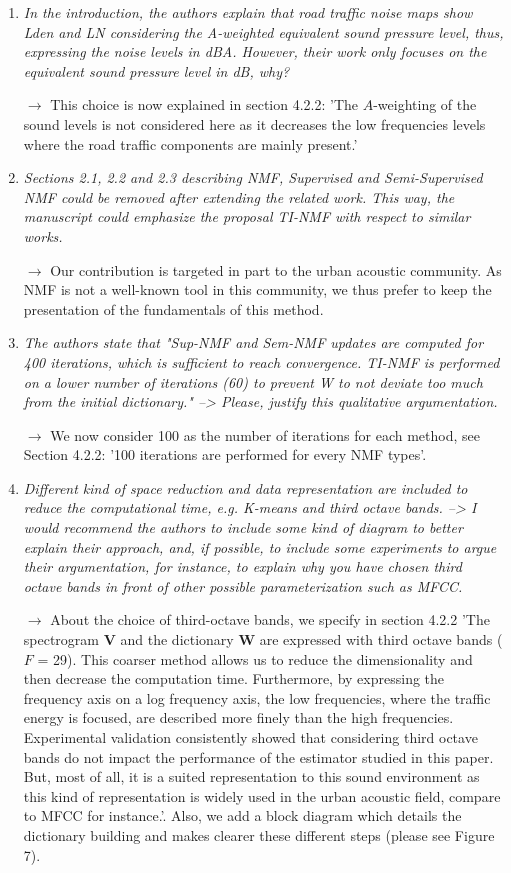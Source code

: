 \documentclass[10pt]{article}
\begin{document}
\begin{enumerate}
\item \emph{In the introduction, the authors explain that road traffic noise maps show Lden and LN considering the A-weighted equivalent sound pressure level, thus, expressing the noise levels in dBA. However, their work only focuses on the equivalent sound pressure level in dB, why? }

$\rightarrow$ This choice is now explained in section 4.2.2: 'The $A$-weighting of the sound levels is not considered here as it decreases the low frequencies levels where the road traffic components are mainly present.'

\item \emph{Sections 2.1, 2.2 and 2.3 describing NMF, Supervised and Semi-Supervised NMF could be removed after extending the related work. This way, the manuscript could emphasize the proposal TI-NMF with respect to similar works.}

$\rightarrow$ Our contribution is targeted in part to the urban acoustic community. As NMF is not a well-known tool in this community, we thus prefer to keep the presentation of the fundamentals of this method.

\item \emph{The authors state that "Sup-NMF and Sem-NMF updates are computed for 400 iterations, which is sufficient to reach convergence. TI-NMF is performed on a lower number of iterations (60) to prevent W to not deviate too much from the initial dictionary." --> Please, justify this qualitative argumentation.}

$\rightarrow$ We now consider 100 as the number of iterations for each method, see Section 4.2.2: '100 iterations are performed for every NMF types'.

\item \emph{Different kind of space reduction and data representation are included to reduce the computational time, e.g. K-means and third octave bands. --> I would recommend the authors to include some kind of diagram to better explain their approach, and, if possible, to include some experiments to argue their argumentation, for instance, to explain why you have chosen third octave bands in front of other possible parameterization such as MFCC.}

$\rightarrow$ About the choice of third-octave bands, we specify in section 4.2.2 'The spectrogram $\mathbf{V}$ and the dictionary $\mathbf{W}$ are expressed with third octave bands ($F$ = 29). This coarser method allows us to reduce the dimensionality and then decrease the computation time. Furthermore, by expressing the frequency axis on a log frequency axis, the low frequencies, where the traffic energy is focused, are described more finely than the high frequencies. Experimental validation consistently showed that considering third octave bands do not impact the performance of the estimator studied in this paper. But, most of all, it is a suited representation to this sound environment as this kind of representation is widely used in the urban acoustic field, compare to MFCC for instance.'. Also, we add a block diagram which details the dictionary building and makes clearer these different steps (please see Figure 7).


\end{enumerate}
\end{document}
